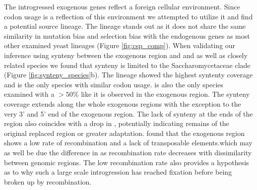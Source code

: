 The introgressed exogenous genes reflect a foreign cellular environment.
Since codon usage is a reflection of this environment we attempted to utilize it and find a potential source lineage.
The \gossypii lineage stands out as it does not share the same similarity in mutation bias and selection bias with the endogenous genes as most other examined yeast lineages (Figure \ref{fig:csp_comp}).
When validating our inference using synteny between the exogenous region and \dubl and \gossypii as well as closely related species we found that synteny is limited to the Saccharomycetaceae clade (Figure \ref{fig:synteny_species}b).
The \gossypii lineage showed the highest syntenty coverage and is the only species with similar codon usage.
\gossypii is also the only species examined with a \GC $> 50 \%$ like it is observed in the exogenous region.
The synteny coverage extends along the whole exogenous regions with the exception to the very 3' and 5' end of the exogenous region. 
The lack of synteny at the ends of the region also coincides with a drop in \GC, potentially indicating remains of the original replaced region or greater adaptation.
\citet{payen2009} found that the exogenous region shows a low rate of recombination and a lack of transposable elements.which may as well be due the difference in \GC as recombination rate decreases with dissimilarity between genomic regions.
The low recombination rate also provides a hypothesis as to why such a large scale introgression has reached fixation before being broken up by recombination.

